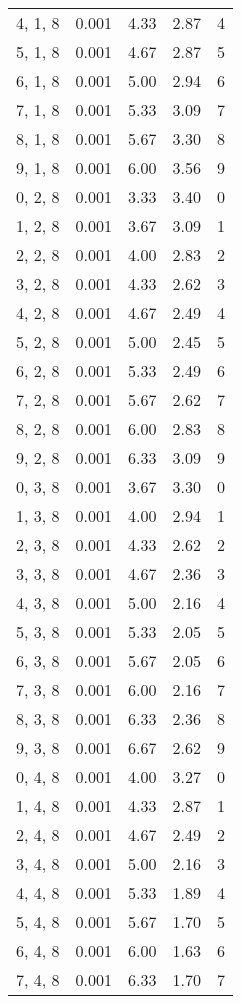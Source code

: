 \documentclass[12pt]{article}
\begin{document}
\begin{tabular}{c || c || c | c | c}
4, 1, 8 & 0.001 & 4.33 & 2.87 & 4 \\
5, 1, 8 & 0.001 & 4.67 & 2.87 & 5 \\
6, 1, 8 & 0.001 & 5.00 & 2.94 & 6 \\
7, 1, 8 & 0.001 & 5.33 & 3.09 & 7 \\
8, 1, 8 & 0.001 & 5.67 & 3.30 & 8 \\
9, 1, 8 & 0.001 & 6.00 & 3.56 & 9 \\
0, 2, 8 & 0.001 & 3.33 & 3.40 & 0 \\
1, 2, 8 & 0.001 & 3.67 & 3.09 & 1 \\
2, 2, 8 & 0.001 & 4.00 & 2.83 & 2 \\
3, 2, 8 & 0.001 & 4.33 & 2.62 & 3 \\
4, 2, 8 & 0.001 & 4.67 & 2.49 & 4 \\
5, 2, 8 & 0.001 & 5.00 & 2.45 & 5 \\
6, 2, 8 & 0.001 & 5.33 & 2.49 & 6 \\
7, 2, 8 & 0.001 & 5.67 & 2.62 & 7 \\
8, 2, 8 & 0.001 & 6.00 & 2.83 & 8 \\
9, 2, 8 & 0.001 & 6.33 & 3.09 & 9 \\
0, 3, 8 & 0.001 & 3.67 & 3.30 & 0 \\
1, 3, 8 & 0.001 & 4.00 & 2.94 & 1 \\
2, 3, 8 & 0.001 & 4.33 & 2.62 & 2 \\
3, 3, 8 & 0.001 & 4.67 & 2.36 & 3 \\
4, 3, 8 & 0.001 & 5.00 & 2.16 & 4 \\
5, 3, 8 & 0.001 & 5.33 & 2.05 & 5 \\
6, 3, 8 & 0.001 & 5.67 & 2.05 & 6 \\
7, 3, 8 & 0.001 & 6.00 & 2.16 & 7 \\
8, 3, 8 & 0.001 & 6.33 & 2.36 & 8 \\
9, 3, 8 & 0.001 & 6.67 & 2.62 & 9 \\
0, 4, 8 & 0.001 & 4.00 & 3.27 & 0 \\
1, 4, 8 & 0.001 & 4.33 & 2.87 & 1 \\
2, 4, 8 & 0.001 & 4.67 & 2.49 & 2 \\
3, 4, 8 & 0.001 & 5.00 & 2.16 & 3 \\
4, 4, 8 & 0.001 & 5.33 & 1.89 & 4 \\
5, 4, 8 & 0.001 & 5.67 & 1.70 & 5 \\
6, 4, 8 & 0.001 & 6.00 & 1.63 & 6 \\
7, 4, 8 & 0.001 & 6.33 & 1.70 & 7 \\

\end{tabular}
\end{document}
